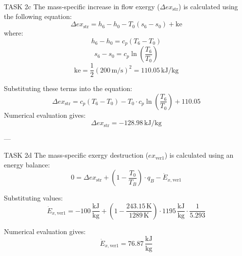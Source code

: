 TASK 2c  
The mass-specific increase in flow exergy (\( \Delta ex_{\text{str}} \)) is calculated using the following equation:  
\[
\Delta ex_{\text{str}} = h_6 - h_0 - T_0(s_6 - s_0) + \text{ke}
\]  
where:  
\[
h_6 - h_0 = c_p (T_6 - T_0)
\]  
\[
s_6 - s_0 = c_p \ln \left( \frac{T_6}{T_0} \right)
\]  
\[
\text{ke} = \frac{1}{2} \left( 200 \, \text{m/s} \right)^2 = 110.05 \, \text{kJ/kg}
\]  

Substituting these terms into the equation:  
\[
\Delta ex_{\text{str}} = c_p (T_6 - T_0) - T_0 \cdot c_p \ln \left( \frac{T_6}{T_0} \right) + 110.05
\]  
Numerical evaluation gives:  
\[
\Delta ex_{\text{str}} = -128.98 \, \text{kJ/kg}
\]  

---

TASK 2d  
The mass-specific exergy destruction (\( ex_{\text{ver1}} \)) is calculated using an energy balance:  
\[
0 = \Delta ex_{\text{str}} + \left( 1 - \frac{T_0}{T_B} \right) \cdot q_B - \dot{E}_{x,\text{ver1}}
\]  

Substituting values:  
\[
\dot{E}_{x,\text{ver1}} = -100 \, \frac{\text{kJ}}{\text{kg}} + \left( 1 - \frac{243.15 \, \text{K}}{1289 \, \text{K}} \right) \cdot 1195 \, \frac{\text{kJ}}{\text{kg}} \cdot \frac{1}{5.293}
\]  

Numerical evaluation gives:  
\[
\dot{E}_{x,\text{ver1}} = 76.87 \, \frac{\text{kJ}}{\text{kg}}
\]